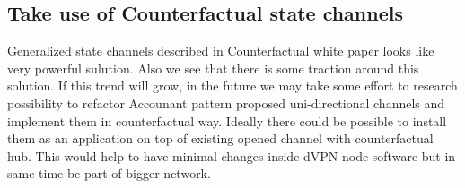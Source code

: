\documentclass[a4paper,12pt]{article}
\begin{document}
\subsection{Take use of Counterfactual state channels}

Generalized state channels described in Counterfactual \cite{counterfactual} 
white paper looks like very powerful sulution. Also we see that there is some
traction around this solution. If this trend will grow, in the future we may
take some effort to research possibility to refactor Accounant pattern proposed 
uni-directional channels and implement them in counterfactual way. Ideally there
could be possible to install them as an application on top of existing opened 
channel with counterfactual hub. This would help to have minimal changes inside 
dVPN node software but in same time be part of bigger network.

\newpage
\printbibliography[heading=bibintoc]
\end{document}
